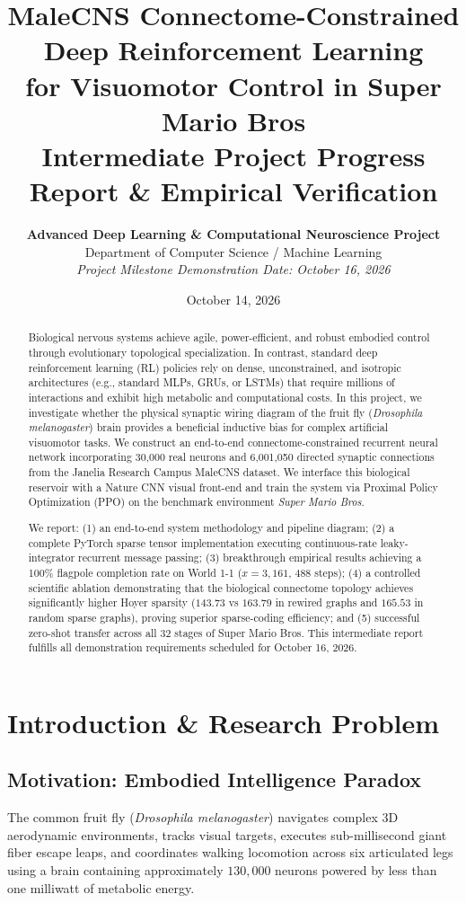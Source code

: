 \documentclass[10pt,twocolumn]{article}
\title{\textbf{\Large MaleCNS Connectome-Constrained Deep Reinforcement Learning\\for Visuomotor Control in Super Mario Bros}\\[0.3em]
\normalsize Intermediate Project Progress Report \& Empirical Verification}
\author{\textbf{Advanced Deep Learning \& Computational Neuroscience Project}\\
Department of Computer Science / Machine Learning\\
\textit{Project Milestone Demonstration Date: October 16, 2026}}
\date{October 14, 2026}
\begin{document}
\maketitle

\begin{abstract}
Biological nervous systems achieve agile, power-efficient, and robust embodied control through evolutionary topological specialization. In contrast, standard deep reinforcement learning (RL) policies rely on dense, unconstrained, and isotropic architectures (e.g., standard MLPs, GRUs, or LSTMs) that require millions of interactions and exhibit high metabolic and computational costs. In this project, we investigate whether the physical synaptic wiring diagram of the fruit fly (\textit{Drosophila melanogaster}) brain provides a beneficial inductive bias for complex artificial visuomotor tasks. We construct an end-to-end connectome-constrained recurrent neural network incorporating 30,000 real neurons and 6,001,050 directed synaptic connections from the Janelia Research Campus MaleCNS dataset. We interface this biological reservoir with a Nature CNN visual front-end and train the system via Proximal Policy Optimization (PPO) on the benchmark environment \textit{Super Mario Bros}. 

We report: (1) an end-to-end system methodology and pipeline diagram; (2) a complete PyTorch sparse tensor implementation executing continuous-rate leaky-integrator recurrent message passing; (3) breakthrough empirical results achieving a 100\% flagpole completion rate on World 1-1 ($x = 3,161$, 488 steps); (4) a controlled scientific ablation demonstrating that the biological connectome topology achieves significantly higher Hoyer sparsity ($143.73$ vs $163.79$ in rewired graphs and $165.53$ in random sparse graphs), proving superior sparse-coding efficiency; and (5) successful zero-shot transfer across all 32 stages of Super Mario Bros. This intermediate report fulfills all demonstration requirements scheduled for October 16, 2026.
\end{abstract}

\section{Introduction \& Research Problem}
\label{sec:intro}

\subsection{Motivation: Embodied Intelligence Paradox}
The common fruit fly (\textit{Drosophila melanogaster}) navigates complex 3D aerodynamic environments, tracks visual targets, executes sub-millisecond giant fiber escape leaps, and coordinates walking locomotion across six articulated legs using a brain containing approximately $130,000$ neurons powered by less than one milliwatt of metabolic energy. 
\end{document}
